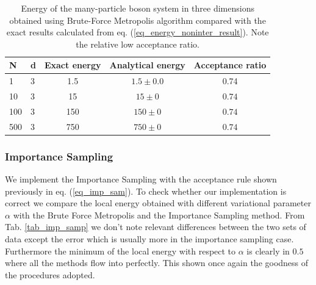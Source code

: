 \begin{table}[H]
\caption{Energy of the many-particle boson system in three dimensions obtained using Brute-Force Metropolis algorithm compared with the exact results calculated from eq. (\ref{eq_energy_noninter_result}). Note the relative low acceptance ratio.}
\centering
\begin{tabular}{l l |c c c} 
\textbf{N} & \textbf{d}  & \textbf{Exact energy} & \textbf{Analytical energy} & \textbf{Acceptance ratio} \\\hline 
1 & 3& 1.5 &  $1.5\pm0.0$ & 0.74 \\ 
10 & 3& 15 & $15\pm0$ & $0.74$\\
100 & 3&150 & $150\pm0$ & $0.74$ \\
500 & 3&750 & $750\pm0$  & $0.74$\\ 
\end{tabular}
\label{tab_brute_energy}
\end{table} 





\subsubsection{Importance Sampling}
We implement the Importance Sampling with the acceptance rule shown previously in eq. (\ref{eq_imp_sam}). To check whether our implementation is correct we compare the local energy obtained with different variational parameter $\alpha$ with the Brute Force Metropolis and the Importance Sampling method. From Tab. \ref{tab_imp_samp} we don't note relevant differences between the two sets of data except the error which is usually more in the importance sampling case. Furthermore 
the minimum of the local energy with respect to $\alpha$ is clearly in $0.5$ where all the methods flow into perfectly. This shown once again the goodness of the procedures adopted.

